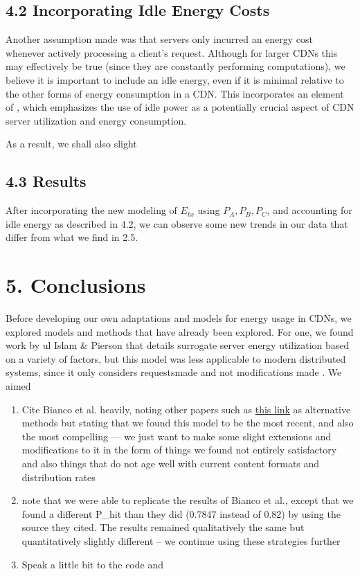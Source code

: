 \documentclass[
	a4paper, %
	10pt, %
	unnumberedsections, %
	twoside, %
]{LTJournalArticle}
\begin{document}
\subsection{4.2 Incorporating Idle Energy Costs}
Another assumption made was that servers only incurred an energy cost whenever actively processing a client's request. Although for larger CDNs this may effectively be true (since they are constantly performing computations),  we believe it is important to include an idle energy, even if it is minimal relative to the other forms of energy consumption in a CDN. This incorporates an element of \cite{ulIslam2012}, which emphasizes the use of idle power as a potentially crucial aspect of CDN server utilization and energy consumption.

As a result, we shall also slight
\subsection{4.3 Results}
After incorporating the new modeling of $E_{tx}$ using $P_A, P_B, P_C$, and accounting for idle energy as described in 4.2, we can observe some new trends in our data that differ from what we find in 2.5. 


\section{5. Conclusions}

Before developing our own adaptations and models for energy usage in CDNs, we explored models and methods that have already been explored. For one, we found work by ul Islam \& Pierson that details surrogate server energy utilization based on a variety of factors, but this model was less applicable to modern distributed systems, since it only considers requestsmade and not modifications made \cite{ulIslam2012}. We aimed
\begin{enumerate}
    \item Cite Bianco et al. heavily, noting other papers such as \href{https://link.springer.com/chapter/10.1007/978-3-642-32606-6\_6}{this link} as alternative methods but stating that we found this model to be the most recent, and also the most compelling --- we just want to make some slight extensions and modifications to it in the form of things we found not entirely satisfactory and also things that do not age well with current content formats and distribution rates
    \item note that we were able to replicate the results of Bianco et al., except that we found a different P\_hit than they did (0.7847 instead of 0.82) by using the source they cited. The results remained qualitatively the same but quantitatively slightly different -- we continue using these strategies further
    \item Speak a little bit to the code and
\end{enumerate}
\end{document}

